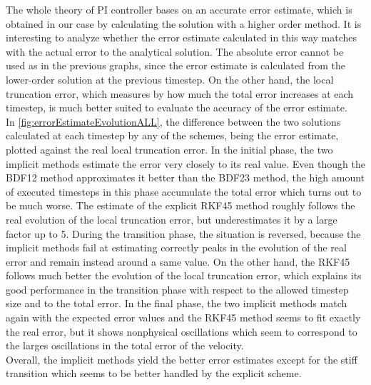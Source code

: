 \documentclass{report}
\begin{document}
The whole theory of PI controller bases on an accurate error estimate, which is obtained in our case by calculating the solution with a higher order method. It is interesting to analyze whether the error estimate calculated in this way matches with the actual error to the analytical solution. The absolute error cannot be used as in the previous graphs, since the error estimate is calculated from the lower-order solution at the previous timestep. On the other hand, the local truncation error, which measures by how much the total error increases at each timestep, is much better suited to evaluate the accuracy of the error estimate. \\
In \autoref{fig:errorEstimateEvolutionALL}, the difference between the two solutions calculated at each timestep by any of the schemes, being the error estimate, plotted against the real local truncation error. In the initial phase, the two implicit methods estimate the error very closely to its real value. Even though the BDF12 method approximates it better than the BDF23 method, the high amount of executed timesteps in this phase accumulate the total error which turns out to be much worse. The estimate of the explicit RKF45 method roughly follows the real evolution of the local truncation error, but underestimates it by a large factor up to 5. During the transition phase, the situation is reversed, because the implicit methods fail at estimating correctly peaks in the evolution of the real error and remain instead around a same value. On the other hand, the RKF45 follows much better the evolution of the local truncation error, which explains its good performance in the transition phase with respect to the allowed timestep size and to the total error. In the final phase, the two implicit methods match again with the expected error values and the RKF45 method seems to fit exactly the real error, but it shows nonphysical oscillations which seem to correspond to the larges oscillations in the total error of the velocity. \\
Overall, the implicit methods yield the better error estimates except for the stiff transition which seems to be better handled by the explicit scheme. 
\end{document}
